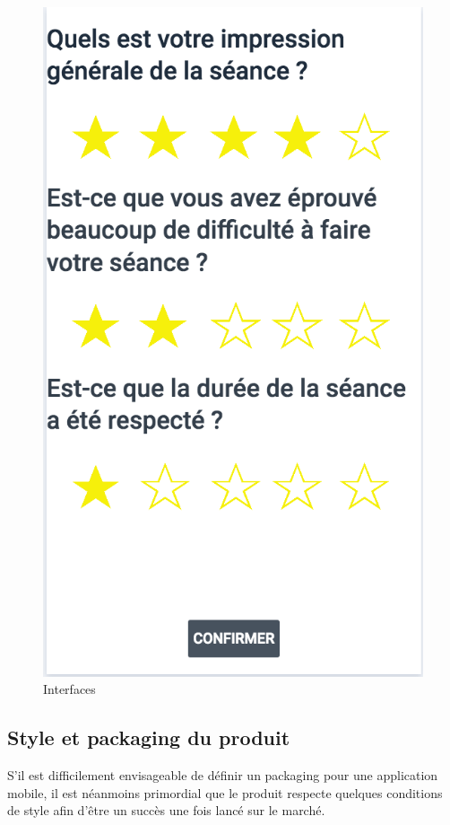 \begin{figure}[!h]
	\includegraphics[scale=0.3]{ihms/rating_before_update}
	\caption{\label{fig:interfaces}Interfaces}
\end{figure}

\subsection*{Style et packaging du produit}
S'il est difficilement envisageable de définir un packaging pour une application mobile, il est néanmoins primordial que le produit respecte quelques conditions de style afin d'être un succès une fois lancé sur le marché.\\

